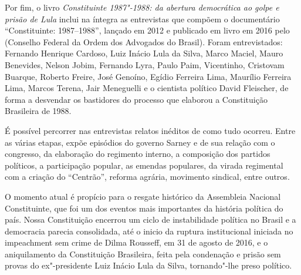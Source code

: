Por fim, o livro \emph{Constituinte 1987"-1988: da abertura democrática
ao golpe e prisão de Lula} inclui na íntegra as entrevistas
que compõem o documentário ``Constituinte: 1987--1988'', lançado em 2012 e
publicado em livro em 2016 pelo  (Conselho Federal da Ordem dos Advogados do
Brasil). Foram entrevistados: Fernando Henrique Cardoso, Luiz Inácio Lula da Silva, Marco
Maciel, Mauro Benevides, Nelson Jobim, Fernando Lyra, Paulo Paim, Vicentinho, Cristovam Buarque,
Roberto Freire, José Genoíno, Egídio Ferreira Lima, Maurílio Ferreira Lima, Marcos Terena, Jair
Meneguelli e o cientista político David Fleischer, de forma a desvendar os bastidores do
processo que elaborou a Constituição Brasileira de 1988.

É possível percorrer nas entrevistas relatos inéditos de como tudo ocorreu. Entre as várias
etapas, expõe episódios do governo Sarney e de sua relação com o congresso, da elaboração do
regimento interno, a composição dos partidos políticos, a participação popular, as emendas
populares, da virada regimental com a criação do “Centrão”, reforma agrária, movimento sindical,
entre outros.

O momento atual é propício para o resgate histórico da Assembleia Nacional Constituinte, que
foi um dos eventos mais importantes da história política do país. Nossa Constituição encerrou
um ciclo de instabilidade política no Brasil e a democracia parecia consolidada, até o inicio da
ruptura institucional iniciada no impeachment sem crime de Dilma Rousseff, em 31 de agosto de
2016, e o aniquilamento da Constituição Brasileira, feita pela condenação e prisão sem provas
do ex"-presidente Luiz Inácio Lula da Silva, tornando"-lhe preso político.